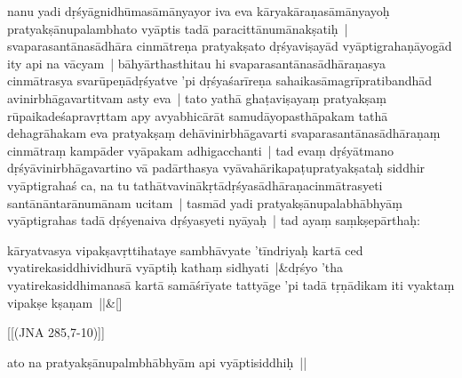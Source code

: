 \documentclass[article,a4paper]{memoir}
\begin{document}
	  \pstart nanu yadi dṛśyā\-gnidhū\-masā\-mā\-nyayor iva  eva kā\-ryakā\-raṇasā\-mā\-nyayoḥ pratyakṣā\-nupalambhato vyā\-ptis tadā\- paracittā\-numā\-nakṣatiḥ | svaparasantā\-nasā\-dhā\-ra cinmā\-treṇa pratyakṣato dṛśyaviṣayā\-d vyā\-ptigrahaṇā\-yogā\-d ity api na vā\-cyam | bā\-hyā\-rthasthitau hi svaparasantā\-nasā\-dhā\-raṇasya cinmā\-trasya svarū\-peṇā\-dṛśyatve 'pi dṛśyaśarī\-reṇa sahaikasā\-magrī\-pratibandhā\-d avinirbhā\-gavartitvam asty eva | tato yathā\- ghaṭaviṣayaṃ pratyakṣaṃ rū\-paikadeśapravṛttam apy avyabhicā\-rā\-t samudā\-yopasthā\-pakam tathā\- dehagrā\-hakam eva pratyakṣaṃ dehā\-vinirbhā\-gavarti svaparasantā\-nasā\-dhā\-raṇaṃ cinmā\-traṃ kampā\-der vyā\-pakam adhigacchanti | tad evaṃ dṛśyā\-tmano dṛśyā\-vinirbhā\-gavartino vā\- padā\-rthasya vyā\-vahā\-rikapaṭupratyakṣataḥ siddhir vyā\-ptigrahaś ca, na tu tathā\-tvavinā\-kṛtā\-dṛśyasā\-dhā\-raṇacinmā\-trasyeti santā\-nā\-ntarā\-numā\-nam ucitam | tasmā\-d yadi pratyakṣā\-nupalabhā\-bhyā\-ṃ vyā\-ptigrahas tadā\- dṛśyenaiva dṛśyasyeti nyā\-yaḥ | \label{thakur75-45.24} tad ayaṃ saṃkṣepā\-rthaḥ:
	\pend
      
	    
	    \stanza[\smallbreak]
kā\-ryatvasya vipakṣavṛttihataye sambhā\-vyate 'tī\-ndriyaḥ kartā\- ced vyatirekasiddhividhurā\- vyā\-ptiḥ kathaṃ sidhyati |&dṛśyo 'tha vyatirekasiddhimanasā\- kartā\- samā\-śrī\-yate tattyā\-ge 'pi tadā\- tṛṇā\-dikam iti vyaktaṃ vipakṣe kṣaṇam ||\&[\smallbreak]


	[[(JNA 285,7-10)]]

	  \pstart ato na pratyakṣā\-nupalmbhā\-bhyā\-m api vyā\-ptisiddhiḥ ||
	\pend
      
	  
	
\end{document}
